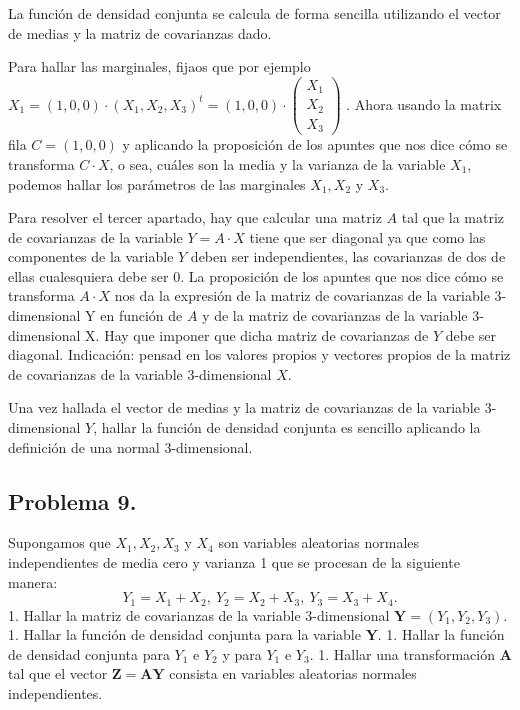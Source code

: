 \documentclass[
]{article}
\begin{document}
La función de densidad conjunta se calcula de forma sencilla utilizando
el vector de medias y la matriz de covarianzas dado.

Para hallar las marginales, fijaos que por ejemplo
\(X_1=(1,0,0)\cdot (X_1,X_2,X_3)^t=(1,0,0)\cdot \begin{pmatrix}X_1\\ X_2\\ X_3\end{pmatrix}\)
. Ahora usando la matrix fila \(C=(1,0,0)\) y aplicando la proposición
de los apuntes que nos dice cómo se transforma \(C\cdot X\), o sea,
cuáles son la media y la varianza de la variable \(X_1\), podemos hallar
los parámetros de las marginales \(X_1, X_2\) y \(X_3\).

Para resolver el tercer apartado, hay que calcular una matriz \(A\) tal
que la matriz de covarianzas de la variable \(Y = A\cdot X\) tiene que
ser diagonal ya que como las componentes de la variable \(Y\) deben ser
independientes, las covarianzas de dos de ellas cualesquiera debe ser
\(0\). La proposición de los apuntes que nos dice cómo se transforma
\(A\cdot X\) nos da la expresión de la matriz de covarianzas de la
variable 3-dimensional Y en función de \(A\) y de la matriz de
covarianzas de la variable 3-dimensional X. Hay que imponer que dicha
matriz de covarianzas de \(Y\) debe ser diagonal. Indicación: pensad en
los valores propios y vectores propios de la matriz de covarianzas de la
variable 3-dimensional \(X\).

Una vez hallada el vector de medias y la matriz de covarianzas de la
variable 3-dimensional \(Y\), hallar la función de densidad conjunta es
sencillo aplicando la definición de una normal 3-dimensional.

\hypertarget{problema-9.}{%
\subsection{Problema 9.}\label{problema-9.}}

Supongamos que \(X_1, X_2, X_3\) y \(X_4\) son variables aleatorias
normales independientes de media cero y varianza 1 que se procesan de la
siguiente manera: \[
Y_1 = X_1 + X_2,\  Y_2 = X_2 + X_3,\  Y_3 = X_3 + X_4.
\] 1. Hallar la matriz de covarianzas de la variable \(3\)-dimensional
\(\mathbf{Y} = (Y_1, Y_2, Y_3)\). 1. Hallar la función de densidad
conjunta para la variable \(\mathbf{Y}\). 1. Hallar la función de
densidad conjunta para \(Y_1\) e \(Y_2\) y para \(Y_1\) e \(Y_3\). 1.
Hallar una transformación \(\mathbf{A}\) tal que el vector
\(\mathbf{Z} = \mathbf{A}\mathbf{Y}\) consista en variables aleatorias
normales independientes.
\end{document}
